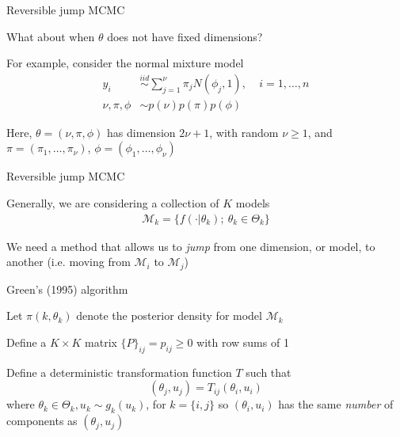 \documentclass[mathserif, 12pt, t]{beamer}
\newcommand{\m}[1]{#1}
\renewcommand{\frametitle}[1]{\vspace{0.14cm}\hspace{-0.70cm}\textcolor{col2}{%
    \Large{#1}}\vspace{0.15cm}\newline}
\begin{document}
\begin{frame}
\frametitle{Reversible jump MCMC}

What about when $\m{\theta}$ does not have fixed dimensions?
\bigskip

For example, consider the normal mixture model
\begin{align*}
y_i &\overset{iid}\sim \sum_{j=1}^\nu \pi_j N(\phi_j, 1),~~~~~i=1,\ldots,n \\
\nu,\m{\pi},\m{\phi} &\sim p(\nu)p(\m{\pi})p(\m{\phi}) 
\end{align*}

Here, $\m{\theta}=(\nu,\m{\pi}, \m{\phi})$ has dimension $2\nu+1$, with random $\nu\geq 1$, and $\pi=(\pi_1,\ldots,\pi_\nu)$, $\phi=(\phi_1,\ldots,\phi_\nu)$

\end{frame}


\begin{frame}
\frametitle{Reversible jump MCMC}

Generally, we are considering a collection of $K$ models
\begin{align*}
\mathcal{M}_k=\{f(\cdot|\theta_k);~\theta_k\in\Theta_k\} 
\end{align*}

We need a method that allows us to \emph{jump} from one dimension, or model, to another (i.e. moving from $\mathcal{M}_i$ to $\mathcal{M}_j$)

\end{frame}

\begin{frame}
\frametitle{Green's (1995) algorithm}


Let $\pi(k, \theta_k)$ denote the posterior density for model $\mathcal{M}_k$
\bigskip

Define a $K\times K$ matrix $\{P\}_{ij} = p_{ij}\geq 0$ with row sums of 1
\bigskip

Define a deterministic transformation function $T$ such that
\[(\theta_j,u_j) = T_{ij}(\theta_i,u_i)\]
where $\theta_k\in\Theta_k, u_k\sim g_k(u_k)$, for $k=\{i,j\}$ so $(\theta_i,u_i)$ has the same \emph{number} of components as $(\theta_j,u_j)$

\end{frame}
\end{document}
